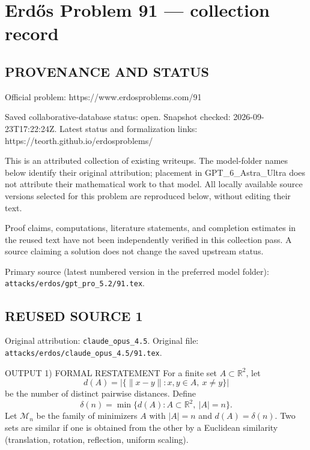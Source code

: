 \section*{Erd\H{o}s Problem 91 --- collection record}

\subsection*{PROVENANCE AND STATUS}
Official problem: https://www.erdosproblems.com/91

Saved collaborative-database status: open.
Snapshot checked: 2026-09-23T17:22:24Z.
Latest status and formalization links: https://teorth.github.io/erdosproblems/

This is an attributed collection of existing writeups. The model-folder names below identify their original attribution; placement in GPT\_6\_Astra\_Ultra does not attribute their mathematical work to that model. All locally available source versions selected for this problem are reproduced below, without editing their text.

Proof claims, computations, literature statements, and completion estimates in the reused text have not been independently verified in this collection pass. A source claiming a solution does not change the saved upstream status.

Primary source (latest numbered version in the preferred model folder): \texttt{attacks/erdos/gpt\_pro\_5.2/91.tex}.

\subsection*{REUSED SOURCE 1}
Original attribution: \texttt{claude\_opus\_4.5}.
Original file: \texttt{attacks/erdos/claude\_opus\_4.5/91.tex}.


OUTPUT
1) FORMAL RESTATEMENT
For a finite set $A\subset\mathbb{R}^2$, let
\[
d(A)=\bigl|\{\|x-y\|: x,y\in A,\ x\ne y\}\bigr|
\]
be the number of distinct pairwise distances. Define
\[\delta(n)=\min\{d(A): A\subset\mathbb{R}^2,\ |A|=n\}.\]
Let $\mathcal{M}_n$ be the family of minimizers $A$ with $|A|=n$ and $d(A)=\delta(n)$.
Two sets are similar if one is obtained from the other by a Euclidean similarity
(translation, rotation, reflection, uniform scaling).


